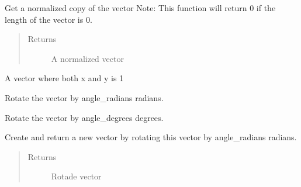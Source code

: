 \documentclass[letterpaper,10pt,english]{sphinxmanual}
\begin{document}
\begin{fulllineitems}
\begin{fulllineitems}
\end{fulllineitems}


\begin{fulllineitems}
\label{geometry:serge.simplevecs.Vec2d.normalized}
Get a normalized copy of the vector
Note: This function will return 0 if the length of the vector is 0.
\begin{quote}\begin{description}
\item[{Returns}] \leavevmode
A normalized vector

\end{description}\end{quote}

\end{fulllineitems}


\begin{fulllineitems}
\label{geometry:serge.simplevecs.Vec2d.ones}
A vector where both x and y is 1

\end{fulllineitems}


\begin{fulllineitems}
\label{geometry:serge.simplevecs.Vec2d.rotate}
Rotate the vector by angle\_radians radians.

\end{fulllineitems}


\begin{fulllineitems}
\label{geometry:serge.simplevecs.Vec2d.rotate_degrees}
Rotate the vector by angle\_degrees degrees.

\end{fulllineitems}


\begin{fulllineitems}
\label{geometry:serge.simplevecs.Vec2d.rotated}
Create and return a new vector by rotating this vector by 
angle\_radians radians.
\begin{quote}\begin{description}
\item[{Returns}] \leavevmode
Rotade vector


\end{description}
\end{quote}
\end{fulllineitems}
\end{fulllineitems}
\end{document}
